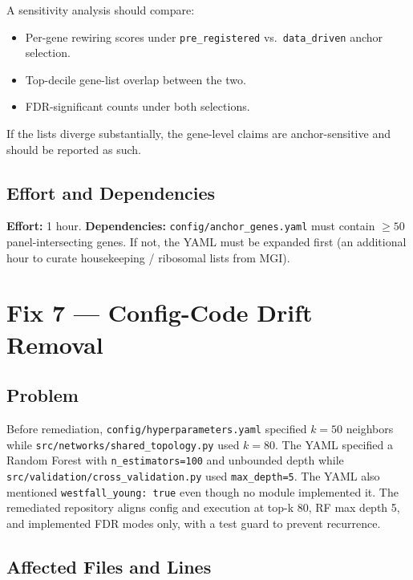 \documentclass[11pt]{article}
\newcommand{\code}[1]{\texttt{#1}}
\begin{document}
A sensitivity analysis should compare:

\begin{itemize}[leftmargin=*]
\item Per-gene rewiring scores under \code{pre\_registered} vs.\ \code{data\_driven} anchor selection.
\item Top-decile gene-list overlap between the two.
\item FDR-significant counts under both selections.
\end{itemize}

If the lists diverge substantially, the gene-level claims are anchor-sensitive and should be reported as such.

\subsection{Effort and Dependencies}

\textbf{Effort:} 1 hour. \textbf{Dependencies:} \code{config/anchor\_genes.yaml} must contain $\geq 50$ panel-intersecting genes. If not, the YAML must be expanded first (an additional hour to curate housekeeping / ribosomal lists from MGI).

\section{Fix 7 --- Config-Code Drift Removal}

\subsection{Problem}

Before remediation, \code{config/hyperparameters.yaml} specified $k=50$ neighbors while \code{src/networks/shared\_topology.py} used $k=80$. The YAML specified a Random Forest with \code{n\_estimators=100} and unbounded depth while \code{src/validation/cross\_validation.py} used \code{max\_depth=5}. The YAML also mentioned \code{westfall\_young: true} even though no module implemented it. The remediated repository aligns config and execution at top-k 80, RF max depth 5, and implemented FDR modes only, with a test guard to prevent recurrence.

\subsection{Affected Files and Lines}
\end{document}

